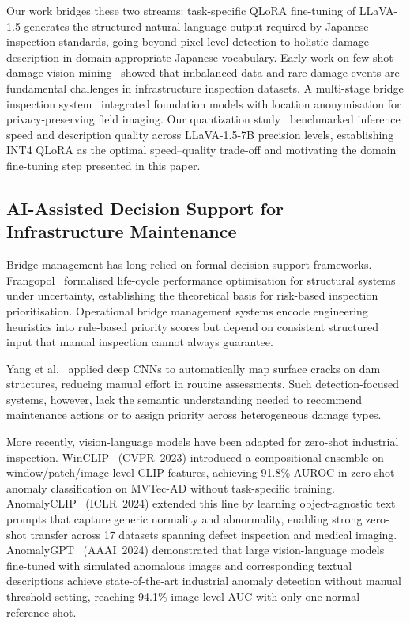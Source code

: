 \documentclass[twocolumn]{article}
\begin{document}
Our work bridges these two streams: task-specific QLoRA fine-tuning of
LLaVA-1.5 generates the structured natural language output required by
Japanese inspection standards, going beyond pixel-level detection to holistic
damage description in domain-appropriate Japanese vocabulary.
Early work on few-shot damage vision mining~\cite{yasuno2023fewshot}
showed that imbalanced data and rare damage events are fundamental
challenges in infrastructure inspection datasets.
A multi-stage bridge inspection system~\cite{yasuno2026multistage} integrated
foundation models with location anonymisation for privacy-preserving
field imaging.
Our quantization study~\cite{yasuno2026quantized} benchmarked inference
speed and description quality across LLaVA-1.5-7B precision levels,
establishing INT4 QLoRA as the optimal speed--quality trade-off
and motivating the domain fine-tuning step presented in this paper.

\subsection{AI-Assisted Decision Support for Infrastructure Maintenance}

Bridge management has long relied on formal decision-support frameworks.
Frangopol~\cite{frangopol2011lifecycle} formalised life-cycle performance
optimisation for structural systems under uncertainty, establishing the
theoretical basis for risk-based inspection prioritisation.
Operational bridge management systems encode engineering heuristics into
rule-based priority scores but depend on consistent structured input that
manual inspection cannot always guarantee.

Yang et al.~\cite{yang2018dam} applied deep CNNs to automatically map surface
cracks on dam structures, reducing manual effort in routine assessments.
Such detection-focused systems, however, lack the semantic understanding
needed to recommend maintenance actions or to assign priority across
heterogeneous damage types.

More recently, vision-language models have been adapted for zero-shot
industrial inspection.
WinCLIP~\cite{jeong2023winclip} (CVPR~2023) introduced a compositional
ensemble on window/patch/image-level CLIP features, achieving 91.8\% AUROC
in zero-shot anomaly classification on MVTec-AD without task-specific training.
AnomalyCLIP~\cite{zhou2024anomalyclip} (ICLR~2024) extended this line by
learning object-agnostic text prompts that capture generic normality and
abnormality, enabling strong zero-shot transfer across 17 datasets spanning
defect inspection and medical imaging.
AnomalyGPT~\cite{gu2024anomalygpt} (AAAI~2024) demonstrated that large
vision-language models fine-tuned with simulated anomalous images and
corresponding textual descriptions achieve state-of-the-art industrial
anomaly detection without manual threshold setting, reaching 94.1\% image-level
AUC with only one normal reference shot.
\end{document}

